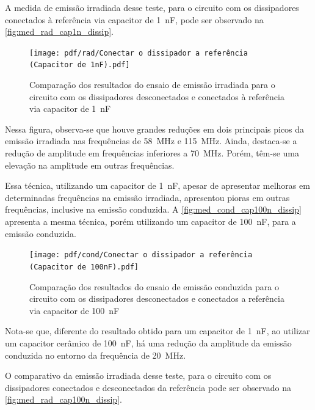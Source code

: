     A medida de emissão irradiada desse teste, para o circuito com os dissipadores conectados à referência via capacitor de \SI{1}{\nano\farad}, pode ser observado na \autoref{fig:med_rad_cap1n_dissip}. 
    
    \begin{figure}[H]
    	\centering
    	\caption{Comparação dos resultados do ensaio de emissão irradiada para o circuito com os dissipadores desconectados e conectados à referência via capacitor de \SI{1}{\nano\farad}}
    	\texttt{[image: pdf/rad/Conectar o dissipador a referência (Capacitor de 1nF).pdf]}
    	\label{fig:med_rad_cap1n_dissip}
    \end{figure}
    
    Nessa figura, observa-se que houve grandes reduções em dois principais picos da emissão irradiada nas frequências de \SI{58}{\mega\hertz} e \SI{115}{\mega\hertz}. Ainda, destaca-se a redução de amplitude em frequências inferiores a \SI{70}{\mega\hertz}. Porém, têm-se uma elevação na amplitude em outras frequências. 
    
    Essa técnica, utilizando um capacitor de \SI{1}{\nano\farad}, apesar de apresentar melhoras em determinadas frequências na emissão irradiada, apresentou pioras em outras frequências, inclusive na emissão conduzida. A \autoref{fig:med_cond_cap100n_dissip} apresenta a mesma técnica, porém utilizando um capacitor de \SI{100}{\nano\farad}, para a emissão conduzida.
    
    \begin{figure}[H]
    	\centering
    	\caption{Comparação dos resultados do ensaio de emissão conduzida para o circuito com os dissipadores desconectados e conectados a referência via capacitor de \SI{100}{\nano\farad}}
    	\texttt{[image: pdf/cond/Conectar o dissipador a referência (Capacitor de 100nF).pdf]}
    	\label{fig:med_cond_cap100n_dissip}
    \end{figure}
    
    Nota-se que, diferente do resultado obtido para um capacitor de \SI{1}{\nano\farad}, ao utilizar um capacitor cerâmico de \SI{100}{\nano\farad}, há uma redução da amplitude da emissão conduzida no entorno da frequência de \SI{20}{\mega\hertz}. 
    
    O comparativo da emissão irradiada desse teste, para o circuito com os dissipadores conectados e desconectados da referência pode ser observado na \autoref{fig:med_rad_cap100n_dissip}.
    
